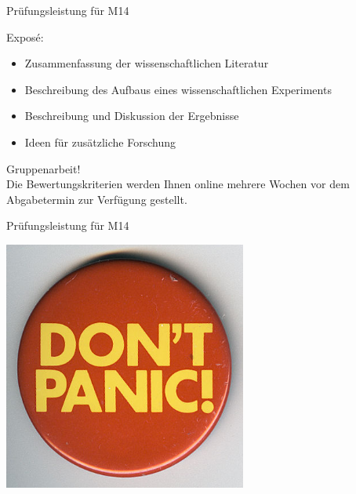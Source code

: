 \documentclass{beamer}
\begin{document}
\begin{frame}{Prüfungsleistung für M14}

\begin{block}{Exposé:}

\begin{itemize}
    \item 
    Zusammenfassung der wissenschaftlichen Literatur 
    \item 
    Beschreibung des Aufbaus eines wissenschaftlichen Experiments
    \item 
    Beschreibung und Diskussion der Ergebnisse
    \item 
    Ideen für zusätzliche Forschung
\end{itemize}
    
\end{block}

Gruppenarbeit! \\

Die Bewertungskriterien werden Ihnen online mehrere Wochen vor dem Abgabetermin zur Verfügung gestellt. 

\end{frame}


\begin{frame}{Prüfungsleistung für M14}

\begin{center}
    \includegraphics[width=0.6\textwidth]{Don't_Panic_Badge.jpg}
\end{center}
\end{frame}
\end{document}
